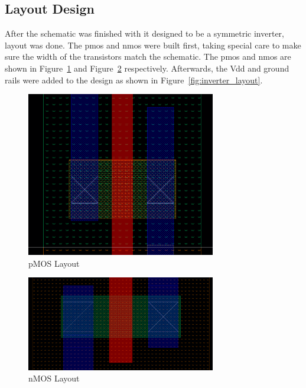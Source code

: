 \documentclass[12pt]{article}
\begin{document}
\subsection{Layout Design}
After the schematic was finished with it designed to be a symmetric inverter, layout was done. The pmos and nmos were built first, taking special care to make sure the width of the transistors match the schematic. The pmos and nmos are shown in Figure~\ref{fig:pmos} and Figure~\ref{fig:nmos} respectively. Afterwards, the Vdd and ground rails were added to the design as shown in Figure~\ref{fig:inverter_layout}.
\begin{figure}[!htb]
  \centering
  \includegraphics[width=3.25in]{figures/pmos.png}
  \caption{pMOS Layout}\label{fig:pmos}
\end{figure}
\begin{figure}[!htb]
  \centering
  \includegraphics[width=3.25in]{figures/nmos.png}
  \caption{nMOS Layout}\label{fig:nmos}
\end{figure}
\end{document}
